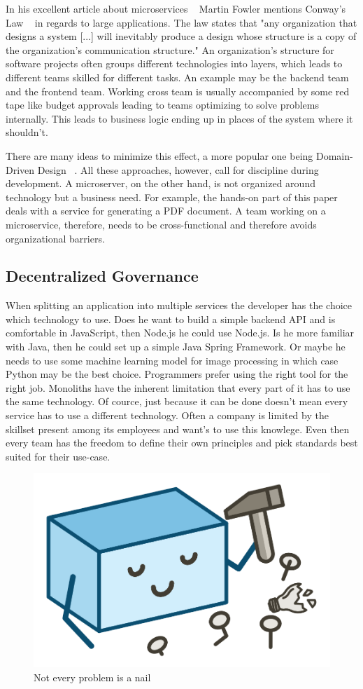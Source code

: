 In his excellent article about microservices ~\cite{microservices.2014} Martin Fowler mentions Conway's Law ~\cite{conway.1968} in regards to large applications. The law states that "any organization that designs a system [...] will inevitably produce a design whose structure is a copy of the organization's communication structure." An organization's structure for software projects often groups different technologies into layers, which leads to different teams skilled for different tasks. An example may be the backend team and the frontend team. Working cross team is usually accompanied by some red tape like budget approvals leading to teams optimizing to solve problems internally. This leads to business logic ending up in places of the system where it shouldn't.

There are many ideas to minimize this effect, a more popular one being Domain-Driven Design ~\cite{evans.2003}. All these approaches, however, call for discipline during development. A microserver, on the other hand, is not organized around technology but a business need. For example, the hands-on part of this paper deals with a service for generating a PDF document. A team working on a microservice, therefore, needs to be cross-functional and therefore avoids organizational barriers.


\subsection{Decentralized Governance}

When splitting an application into multiple services the developer has the choice which technology to use. Does he want to build a simple backend API and is comfortable in JavaScript, then Node.js he could use Node.js. Is he more familiar with Java, then he could set up a simple Java Spring Framework. Or maybe he needs to use some machine learning model for image processing in which case Python may be the best choice. Programmers prefer using the right tool for the right job. Monoliths have the inherent limitation that every part of it has to use the same technology. Of cource, just because it can be done doesn't mean every service has to use a different technology. Often a company is limited by the skillset present among its employees and want's to use this knowlege. Even then every team has the freedom to define their own principles and pick standards best suited for their use-case.

\begin{figure}[ht]
  \centering
  \includegraphics[width=0.4\linewidth]{assets/illustration-monolith-hammer.png}
  \caption{Not every problem is a nail}
  \label{fig:illustration-monolith-hammer}
\end{figure}


